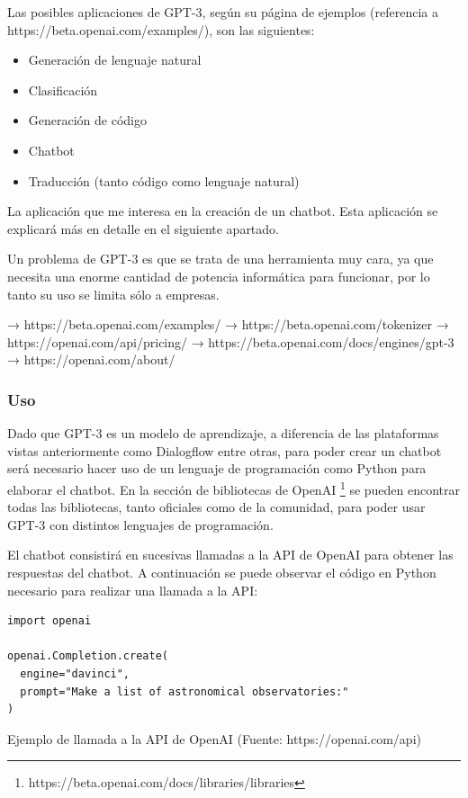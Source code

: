 Las posibles aplicaciones de GPT-3, según su página de ejemplos (referencia a https://beta.openai.com/examples/), son las siguientes:

\begin{itemize}
    \item Generación de lenguaje natural
    \item Clasificación
    \item Generación de código
    \item Chatbot
    \item Traducción (tanto código como lenguaje natural)
\end{itemize}

La aplicación que me interesa en la creación de un chatbot. Esta aplicación se explicará más en detalle en el siguiente apartado.

Un problema de GPT-3 es que se trata de una herramienta muy cara, ya que necesita una enorme cantidad de potencia informática para funcionar, por lo tanto su uso se limita sólo a empresas.





→ https://beta.openai.com/examples/
→ https://beta.openai.com/tokenizer
→ https://openai.com/api/pricing/
→ https://beta.openai.com/docs/engines/gpt-3
→ https://openai.com/about/

\subsubsection*{Uso}

Dado que GPT-3 es un modelo de aprendizaje, a diferencia de las plataformas vistas anteriormente como Dialogflow entre otras, para poder crear un chatbot será necesario hacer uso de un lenguaje de programación como Python para elaborar el chatbot. En la sección de bibliotecas de OpenAI \footnote{https://beta.openai.com/docs/libraries/libraries} se pueden encontrar todas las bibliotecas, tanto oficiales como de la comunidad, para poder usar GPT-3 con distintos lenguajes de programación.

El chatbot consistirá en sucesivas llamadas a la API de OpenAI para obtener las respuestas del chatbot. A continuación se puede observar el código en Python necesario para realizar una llamada a la API:

\begin{lstlisting}
import openai

openai.Completion.create(
  engine="davinci",
  prompt="Make a list of astronomical observatories:"
)
\end{lstlisting}  
\caption{Ejemplo de llamada a la API de OpenAI (Fuente: https://openai.com/api)}

